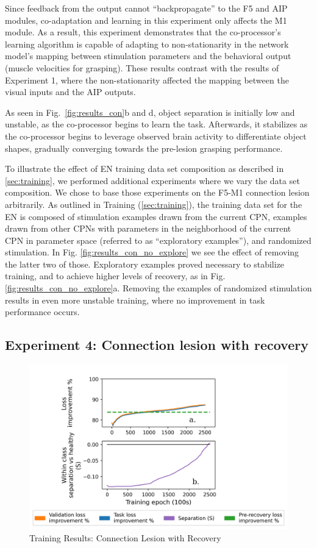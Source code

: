 \documentclass[12pt]{iopart}
\begin{document}
Since feedback from the output cannot ``backpropagate'' to the F5 and AIP modules, co-adaptation and
learning in this experiment only affects the M1 module. As a result, this experiment demonstrates
that the co-processor's learning algorithm is capable of adapting to non-stationarity
in the network model's mapping between stimulation parameters and the behavioral output (muscle velocities
for grasping). These results contrast  with the results of Experiment 1, where the non-stationarity affected
the mapping between the visual inputs and the AIP outputs.

As seen in Fig.~\ref{fig:results_con}b and d, object separation is initially low and unstable, as the
co-processor begins to learn the task. Afterwards, it stabilizes as the co-processor begins to
leverage observed brain activity to differentiate object shapes, gradually converging towards the
pre-lesion grasping performance.

To illustrate the effect of EN training data set composition as described in \ref{sec:training}, we
performed additional experiments where we vary the data set composition. We chose to base those
experiments on the F5-M1 connection lesion arbitrarily. As outlined in Training (\ref{sec:training}),
the training data set for the EN is composed of stimulation examples drawn from the current CPN,
examples drawn from other CPNs with parameters in the neighborhood of the current CPN in parameter
space (referred to as ``exploratory examples''), and randomized stimulation. In Fig.
\ref{fig:results_con_no_explore} we see the effect of removing the latter two of those.
Exploratory examples proved necessary to stabilize training, and to achieve higher levels of recovery,
as in Fig. \ref{fig:results_con_no_explore}a. Removing the examples of randomized stimulation results in
even more unstable training, where no improvement in task performance occurs.

\subsection{Experiment 4: Connection lesion with recovery}

\begin{figure}[h]
\centering
\includegraphics[scale=1]{training_results_recov.png}
\caption{Training Results: Connection Lesion with Recovery}
\label{fig:results_recov}
\end{figure}
\end{document}
